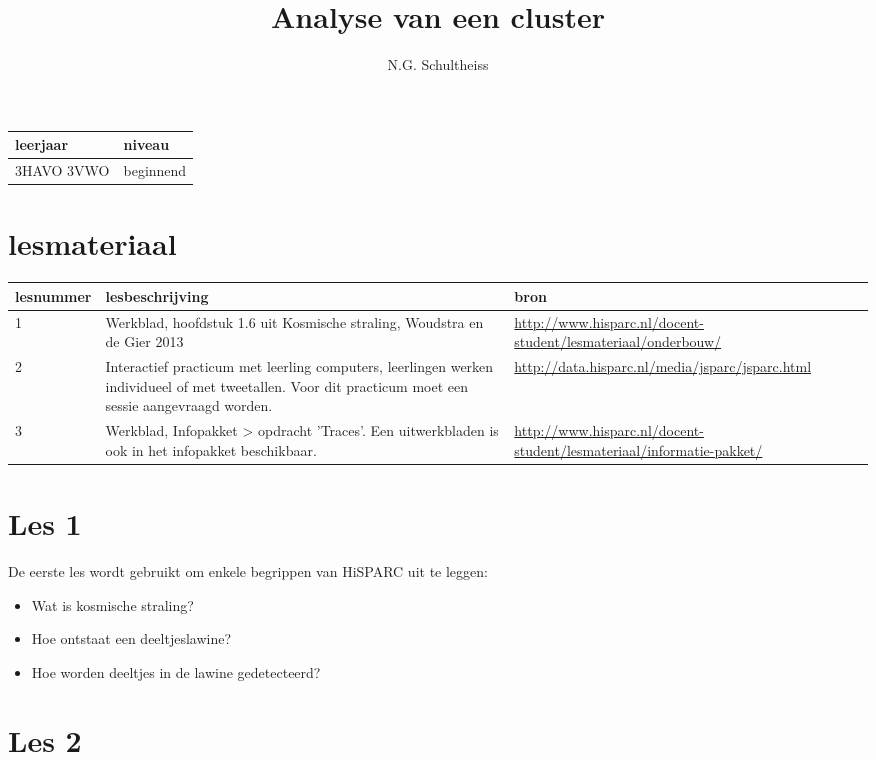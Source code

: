 

\title{Analyse van een cluster}
\author{N.G. Schultheiss}



\maketitle

\begin{tabular}{|>{\raggedright}p{2.5cm}|>{\raggedright}p{12.5cm}|}
\hline
leerjaar & niveau \tabularnewline
\hline
3HAVO 3VWO & beginnend \tabularnewline
\hline
\end{tabular}

\section{lesmateriaal}

\begin{tabular}{ |>{\raggedright}p{2.5cm}|>{\raggedright}p{8cm}|>{\raggedright}p{4cm}|}
\hline
lesnummer & lesbeschrijving & bron \tabularnewline
\hline
1 & 
Werkblad, hoofdstuk 1.6 uit Kosmische straling, Woudstra en de Gier 2013 & 
\url{http://www.hisparc.nl/docent-student/lesmateriaal/onderbouw/} \tabularnewline
\hline
2 & 
Interactief practicum met leerling computers, leerlingen werken individueel of met tweetallen. Voor dit practicum moet een sessie aangevraagd worden. &
\url{http://data.hisparc.nl/media/jsparc/jsparc.html} \tabularnewline
\hline
3 & 
Werkblad, Infopakket > opdracht 'Traces'. Een uitwerkbladen is ook in het infopakket beschikbaar. & 
\url{http://www.hisparc.nl/docent-student/lesmateriaal/informatie-pakket/} \tabularnewline
\hline
\end{tabular}

\section{Les 1}

De eerste les wordt gebruikt om enkele begrippen van HiSPARC uit te leggen:

\begin{itemize}
\item Wat is kosmische straling?
\item Hoe ontstaat een deeltjeslawine?
\item Hoe worden deeltjes in de lawine gedetecteerd?
\end{itemize}

\section{Les 2}

